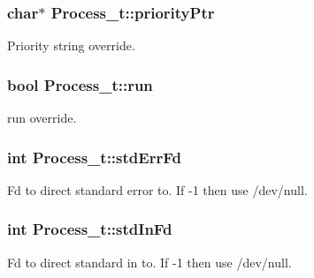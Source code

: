 \subsubsection[{\texorpdfstring{priority\+Ptr}{priorityPtr}}]{\setlength{\rightskip}{0pt plus 5cm}char$\ast$ Process\+\_\+t\+::priority\+Ptr}\hypertarget{struct_process__t_a8d998605746321be5483a294a9170928}{}\label{struct_process__t_a8d998605746321be5483a294a9170928}


Priority string override. 

\subsubsection[{\texorpdfstring{run}{run}}]{\setlength{\rightskip}{0pt plus 5cm}bool Process\+\_\+t\+::run}\hypertarget{struct_process__t_ae23e1715ab2b4297ab3b41b95cdce2bf}{}\label{struct_process__t_ae23e1715ab2b4297ab3b41b95cdce2bf}


run override. 

\subsubsection[{\texorpdfstring{std\+Err\+Fd}{stdErrFd}}]{\setlength{\rightskip}{0pt plus 5cm}int Process\+\_\+t\+::std\+Err\+Fd}\hypertarget{struct_process__t_ae49bce7bce085f31dd320af067e72fbd}{}\label{struct_process__t_ae49bce7bce085f31dd320af067e72fbd}


Fd to direct standard error to. If -\/1 then use /dev/null. 

\subsubsection[{\texorpdfstring{std\+In\+Fd}{stdInFd}}]{\setlength{\rightskip}{0pt plus 5cm}int Process\+\_\+t\+::std\+In\+Fd}\hypertarget{struct_process__t_a62192e689f98e146c6e359e19786837c}{}\label{struct_process__t_a62192e689f98e146c6e359e19786837c}


Fd to direct standard in to. If -\/1 then use /dev/null. 

